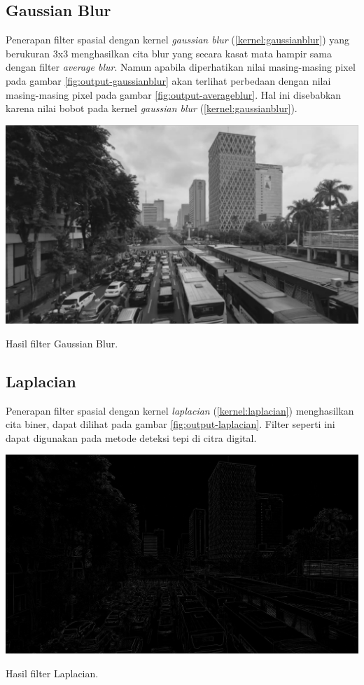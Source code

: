 \subsection{Gaussian Blur}
Penerapan filter spasial dengan kernel \textit{gaussian blur} (\ref{kernel:gaussianblur}) yang berukuran 3x3 menghasilkan cita blur yang secara kasat mata hampir sama dengan filter \textit{average blur}. Namun apabila diperhatikan nilai masing-masing pixel pada gambar \ref{fig:output-gaussianblur} akan terlihat perbedaan dengan nilai masing-masing pixel pada gambar \ref{fig:output-averageblur}. Hal ini disebabkan karena nilai bobot pada kernel \textit{gaussian blur} (\ref{kernel:gaussianblur}). 
\begin{afigure}
    \includegraphics[width=0.8\linewidth, center]{images/output-image/input1-gaussianblur.png}
    \caption{Hasil filter Gaussian Blur.}
    \label{fig:output-gaussianblur}
\end{afigure}

\subsection{Laplacian}
Penerapan filter spasial dengan kernel \textit{laplacian} (\ref{kernel:laplacian}) menghasilkan cita biner, dapat dilihat pada gambar \ref{fig:output-laplacian}. Filter seperti ini dapat digunakan pada metode deteksi tepi di citra digital.
\begin{afigure}
    \includegraphics[width=0.8\linewidth, center]{images/output-image/input1-laplacian.png}
    \caption{Hasil filter Laplacian.}
    \label{fig:output-laplacian}
\end{afigure}

